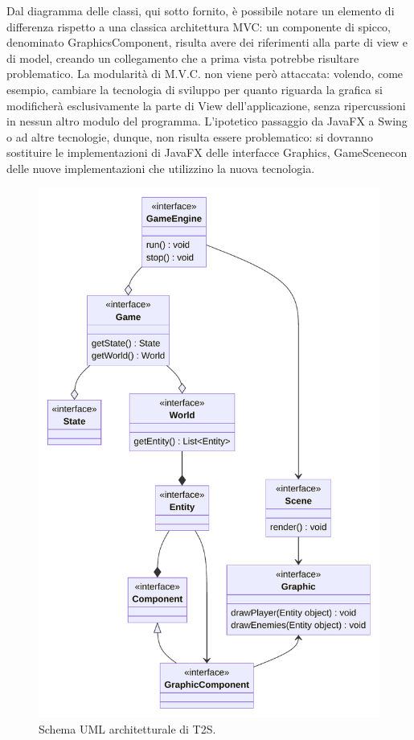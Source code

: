 \documentclass[a4paper,12pt]{report}
\begin{document}
Dal diagramma delle classi, qui sotto fornito, è possibile notare un elemento di differenza rispetto a una classica architettura MVC: un componente di spicco, denominato GraphicsComponent, risulta avere dei riferimenti alla parte di view e di model, creando un collegamento che a prima vista potrebbe risultare problematico.
La modularità di M.V.C. non viene però attaccata: volendo, come esempio, cambiare la tecnologia di sviluppo per quanto riguarda la grafica si modificherà esclusivamente la parte di View dell'applicazione, senza ripercussioni in nessun altro modulo del programma.
L’ipotetico passaggio da JavaFX a Swing o ad altre tecnologie, dunque, non risulta essere problematico: 
si dovranno sostituire le implementazioni di JavaFX delle interfacce Graphics, GameScenecon delle nuove implementazioni che utilizzino la nuova tecnologia.
	
\begin{figure}[H]
\centering{}
\includegraphics[width=1\textwidth]{img/SoftwareArchitectureUML.pdf}
\caption{Schema UML architetturale di T2S.}
\label{img:analysis}
\end{figure}
\end{document}
